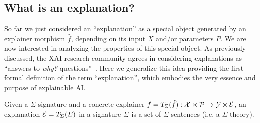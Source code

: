\subsection{What is an explanation?}
So far we just considered an ``explanation'' as a special object generated by an explainer morphism $\hat{f}$, depending on its input $X$ and/or parameters $P$. 
We are now interested in analyzing the properties of this special object.
As previously discussed, the XAI research community agrees in considering explanations as ``answers to \textit{why?} questions''~\cite{miller2019explanation}. 
Here we generalize this idea providing the first formal definition of the term ``explanation'', which embodies the very essence and purpose of explainable AI.
\begin{definition}[Explanation]
    Given a $\Sigma$ signature and a concrete explainer $f=T_{\Sigma}(\hat{f}):\mathcal{X}\times \mathcal{P}\rightarrow \mathcal{Y}\times \mathcal{E}$,
    an explanation $\mathcal{E} = T_{\Sigma}(E)$ in a signature $\Sigma$ is a set of $\Sigma$-sentences (i.e. a $\Sigma$-theory). 
\end{definition}







